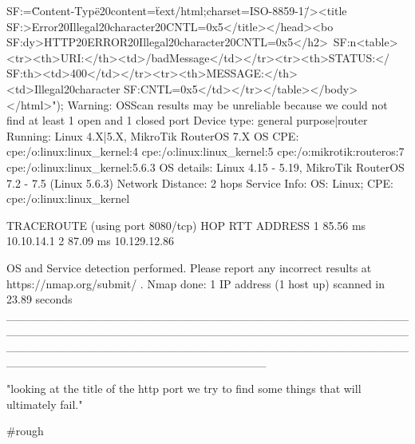 {              SF:=\"Content-Type\"\x20content=\"text/html;charset=ISO-8859-1\"/>\n<title
              SF:>Error\x20Illegal\x20character\x20CNTL=0x5</title>\n</head>\n<bo
              SF:dy>HTTP\x20ERROR\x20Illegal\x20character\x20CNTL=0x5</h2>\
              SF:n<table>\n<tr><th>URI:</th><td>/badMessage</td></tr>\n<tr><th>STATUS:</
              SF:th><td>400</td></tr>MESSAGE:</th><td>Illegal\x20character\x20
              SF:CNTL=0x5</td></tr>\n</table>\n\n</body>\n</html>\n");
              Warning: OSScan results may be unreliable because we could not find at least 1 open and 1 closed port
              Device type: general purpose|router
              Running: Linux 4.X|5.X, MikroTik RouterOS 7.X
              OS CPE: cpe:/o:linux:linux_kernel:4 cpe:/o:linux:linux_kernel:5 cpe:/o:mikrotik:routeros:7 cpe:/o:linux:linux_kernel:5.6.3
              OS details: Linux 4.15 - 5.19, MikroTik RouterOS 7.2 - 7.5 (Linux 5.6.3)
              Network Distance: 2 hops
              Service Info: OS: Linux; CPE: cpe:/o:linux:linux_kernel
              
              TRACEROUTE (using port 8080/tcp)
              HOP RTT      ADDRESS
              1   85.56 ms 10.10.14.1
              2   87.09 ms 10.129.12.86
              
              OS and Service detection performed. Please report any incorrect results at https://nmap.org/submit/ .
              Nmap done: 1 IP address (1 host up) scanned in 23.89 seconds
_______________________________________________________________________________________________________________________________________________________________________________


"looking at the title of the http port we try to find some things that will ultimately fail."

#rough

}

